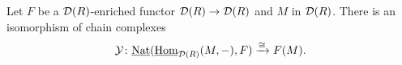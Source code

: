 \begin{theorem}\label{eyoneda}
	Let \(F\) be a \(\mathcal{D}(R)\)-enriched functor \(\mathcal{D}(R) \to \mathcal{D}(R)\) and \(M\) in \(\mathcal{D}(R)\). There is an isomorphism of chain complexes %
	\[
	\operatorname{\mathcal{Y}} \colon \underline{\operatorname{Nat}}(\underline{\mathrm{Hom}}_{\mathcal{D}(R)}(M, -), F)\xrightarrow{\cong} F(M).
	\]
\end{theorem}